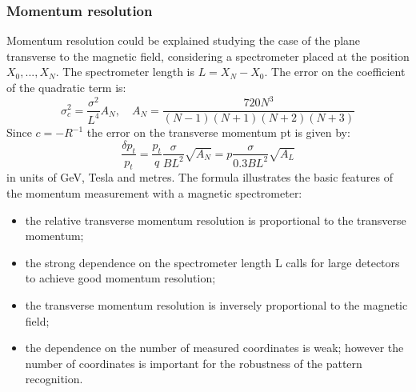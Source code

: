 \subsubsection{Momentum resolution}
Momentum resolution could be explained studying the case of the plane transverse to the magnetic field, considering a spectrometer placed at the position $X_0,...,X_N$. The spectrometer length is $L = X_N - X_0$. The error on the coefficient of the quadratic term is:
\begin{equation}
\sigma_c^2 = \frac{\sigma^2}{L^4}A_N,\quad A_N=\frac{720N^3}{(N-1)(N+1)(N+2)(N+3)}
\end{equation}
Since $c=-R^{-1}$ the error on the transverse momentum pt is given by:
\begin{equation}
\frac{\delta p_t}{p_t} = \frac{p_t}{q}\frac{\sigma}{BL^2}\sqrt{A_N}=p\frac{\sigma}{0.3BL^2}\sqrt{A_L}
\end{equation}
in units of GeV, Tesla and metres. The formula illustrates the basic features of the momentum measurement with a magnetic spectrometer:
\begin{itemize}
\item the relative transverse momentum resolution is proportional to the transverse momentum;
\item the strong dependence on the spectrometer length L calls for large detectors to achieve good momentum resolution;
\item the transverse momentum resolution is inversely proportional to the magnetic field;
\item the dependence on the number of measured coordinates is weak; however the number of coordinates is important for the robustness of the pattern recognition.
\end{itemize}
